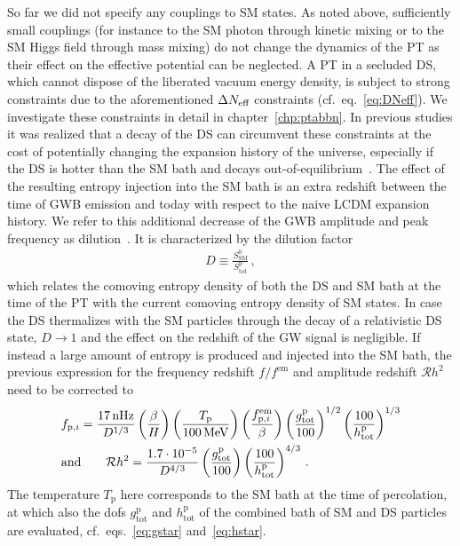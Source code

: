 So far we did not specify any couplings to \ac{SM} states. As noted above, sufficiently small couplings (for instance to the \ac{SM} photon through kinetic mixing or to the \ac{SM} Higgs field through mass mixing) do not change the dynamics of the \ac{PT} as their effect on the effective potential can be neglected. A \ac{PT} in a secluded \ac{DS}, which cannot dispose of the liberated vacuum energy density, is subject to strong constraints due to the aforementioned $\Delta N_\text{eff} $ constraints (cf.~eq.~\eqref{eq:DNeff}). We investigate  these constraints in detail in chapter~\ref{chp:ptabbn}. In previous studies it was realized that a decay of the \ac{DS} can circumvent these constraints at the cost of potentially changing the expansion history of the universe, especially if the \ac{DS} is hotter than the \ac{SM} bath and decays out-of-equilibrium~\cite{Ertas:2021xeh}. The effect of the resulting entropy injection into the \ac{SM} bath is an extra redshift between the time of \ac{GWB} emission and today with respect to the naive \ac{LCDM} expansion history. We refer to this additional decrease of the \ac{GWB} amplitude and peak frequency as dilution~\cite{Cirelli:2018iax}. It is characterized by the dilution factor
\begin{align}
	D \equiv \frac{S_\mathrm{SM}^{0}}{S_\mathrm{tot}^\mathrm{p}} \, ,
\end{align}
which relates the comoving entropy density of both the \ac{DS} and \ac{SM}   bath at the time of the \ac{PT} with the current comoving entropy density of \ac{SM} states. In case the \ac{DS} thermalizes with the \ac{SM} particles through the decay of a relativistic \ac{DS} state, $D \rightarrow 1$ and the effect on the redshift of the \ac{GW} signal is negligible. If instead a large amount of entropy is produced and injected into the \ac{SM} bath, the previous expression for the frequency redshift $f/f^\text{em}$ and amplitude redshift $\mathcal{R}h^2$ need to be corrected to~\cite{Ertas:2021xeh}
\begin{subequations}
	\label{eq:dilution}
	\begin{align}
		&f_{\text{p},i} = \frac{17 \, \text{nHz}}{D^{1/3}} \left( \frac{\beta}{H} \right)  \left( \frac{T_\text{p}}{100 \, \text{MeV}} \right) \left( \frac{f_{\text{p},i}^\text{em}}{\beta} \right)  \left( \frac{g_{\text{tot}}^\text{p}}{100} \right)^{1/2} \left( \frac{100}{h_{\text{tot}}^\text{p}} \right)^{1/3}  \\
		&\text{and} 	\qquad \mathcal{R} h^2 = \frac{1.7 \cdot 10^{-5}}{D^{4/3}} \left( \frac{g_{\text{tot}}^\text{p}}{100} \right) \left( \frac{100}{h_{\text{tot}}^\text{p}} \right)^{4/3} \,. 
	\end{align}
\end{subequations}
The temperature $T_\text{p}$ here corresponds to the \ac{SM} bath at the time of percolation, at which also the \acp{dof} $g_\text{tot}^\text{p}$ and $h_\text{tot}^\text{p}$ of the combined bath of \ac{SM} and \ac{DS} particles are evaluated, cf.~eqs.~\eqref{eq:gstar} and~\eqref{eq:hstar}.